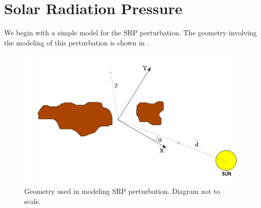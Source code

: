 \section{Solar Radiation Pressure}
\label{srp}
We begin with a simple model for the \gls{SRP} perturbation. The geometry involving the modeling of this perturbation is shown in .

\begin{figure}[h]
\centering
\captionsetup{justification=centering}
\includegraphics[scale=0.5]{srp2.png}
\caption{Geometry used in modeling \gls{SRP} perturbation. Diagram not to scale.}
\label{fig:srp}
\end{figure}
\FloatBarrier
%
